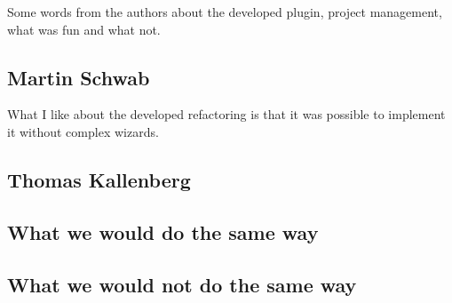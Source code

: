 Some words from the authors about the developed plugin, project management, what 
was fun and what not.

\subsection{Martin Schwab}

What I like about the developed refactoring is that it was possible to implement 
it without complex wizards. 

\subsection{Thomas Kallenberg}


\subsection{What we would do the same way}


\subsection{What we would not do the same way}

